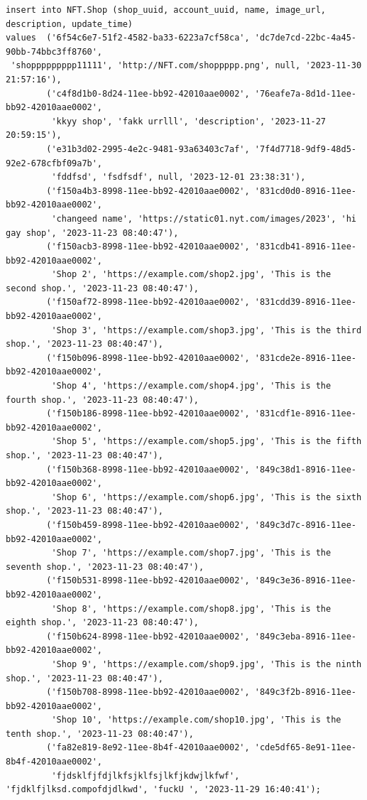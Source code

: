 \documentclass[a4paper, 12pt]{article}
\begin{document}
\begin{verbatim}
insert into NFT.Shop (shop_uuid, account_uuid, name, image_url, description, update_time)
values  ('6f54c6e7-51f2-4582-ba33-6223a7cf58ca', 'dc7de7cd-22bc-4a45-90bb-74bbc3ff8760',
 'shoppppppppp11111', 'http://NFT.com/shoppppp.png', null, '2023-11-30 21:57:16'),
        ('c4f8d1b0-8d24-11ee-bb92-42010aae0002', '76eafe7a-8d1d-11ee-bb92-42010aae0002',
         'kkyy shop', 'fakk urrlll', 'description', '2023-11-27 20:59:15'),
        ('e31b3d02-2995-4e2c-9481-93a63403c7af', '7f4d7718-9df9-48d5-92e2-678cfbf09a7b',
         'fddfsd', 'fsdfsdf', null, '2023-12-01 23:38:31'),
        ('f150a4b3-8998-11ee-bb92-42010aae0002', '831cd0d0-8916-11ee-bb92-42010aae0002',
         'changeed name', 'https://static01.nyt.com/images/2023', 'hi gay shop', '2023-11-23 08:40:47'),
        ('f150acb3-8998-11ee-bb92-42010aae0002', '831cdb41-8916-11ee-bb92-42010aae0002',
         'Shop 2', 'https://example.com/shop2.jpg', 'This is the second shop.', '2023-11-23 08:40:47'),
        ('f150af72-8998-11ee-bb92-42010aae0002', '831cdd39-8916-11ee-bb92-42010aae0002',
         'Shop 3', 'https://example.com/shop3.jpg', 'This is the third shop.', '2023-11-23 08:40:47'),
        ('f150b096-8998-11ee-bb92-42010aae0002', '831cde2e-8916-11ee-bb92-42010aae0002',
         'Shop 4', 'https://example.com/shop4.jpg', 'This is the fourth shop.', '2023-11-23 08:40:47'),
        ('f150b186-8998-11ee-bb92-42010aae0002', '831cdf1e-8916-11ee-bb92-42010aae0002',
         'Shop 5', 'https://example.com/shop5.jpg', 'This is the fifth shop.', '2023-11-23 08:40:47'),
        ('f150b368-8998-11ee-bb92-42010aae0002', '849c38d1-8916-11ee-bb92-42010aae0002',
         'Shop 6', 'https://example.com/shop6.jpg', 'This is the sixth shop.', '2023-11-23 08:40:47'),
        ('f150b459-8998-11ee-bb92-42010aae0002', '849c3d7c-8916-11ee-bb92-42010aae0002',
         'Shop 7', 'https://example.com/shop7.jpg', 'This is the seventh shop.', '2023-11-23 08:40:47'),
        ('f150b531-8998-11ee-bb92-42010aae0002', '849c3e36-8916-11ee-bb92-42010aae0002',
         'Shop 8', 'https://example.com/shop8.jpg', 'This is the eighth shop.', '2023-11-23 08:40:47'),
        ('f150b624-8998-11ee-bb92-42010aae0002', '849c3eba-8916-11ee-bb92-42010aae0002',
         'Shop 9', 'https://example.com/shop9.jpg', 'This is the ninth shop.', '2023-11-23 08:40:47'),
        ('f150b708-8998-11ee-bb92-42010aae0002', '849c3f2b-8916-11ee-bb92-42010aae0002',
         'Shop 10', 'https://example.com/shop10.jpg', 'This is the tenth shop.', '2023-11-23 08:40:47'),
        ('fa82e819-8e92-11ee-8b4f-42010aae0002', 'cde5df65-8e91-11ee-8b4f-42010aae0002',
         'fjdsklfjfdjlkfsjklfsjlkfjkdwjlkfwf', 'fjdklfjlksd.compofdjdlkwd', 'fuckU ', '2023-11-29 16:40:41');
        

\end{verbatim}
\end{document}
